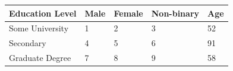 \documentclass{standalone}
\begin{document}
	
	\begin{tabular}{|l|l|l|l|l|}
		\hline
		Education Level & Male & Female & Non-binary & Age\\
		\hline
		Some University & 1 & 2 & 3 & 52 \\
		\hline
		Secondary & 4 & 5 & 6 & 91 \\
		\hline
		Graduate Degree & 7 & 8 & 9 & 58 \\
		\hline
	\end{tabular}
	
\end{document}
